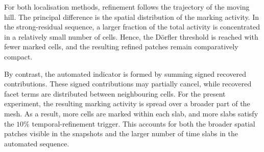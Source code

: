 For both localisation methods, refinement follows the trajectory of the moving hill. The principal difference is the spatial distribution of the marking activity. In the strong-residual sequence, a larger fraction of the total activity is concentrated in a relatively small number of cells. Hence, the D\"orfler threshold is reached with fewer marked cells, and the resulting refined patches remain comparatively compact.

By contrast, the automated indicator is formed by summing signed recovered contributions. 
These signed contributions may partially cancel, while recovered facet terms are distributed between neighbouring cells. For the present experiment, the resulting marking activity is spread over a broader part of the mesh. As a result, more cells are marked within each slab, and more slabs satisfy the \(10\%\) temporal-refinement trigger. This accounts for both the broader spatial patches visible in the snapshots and the larger number of time slabs in the automated sequence.




